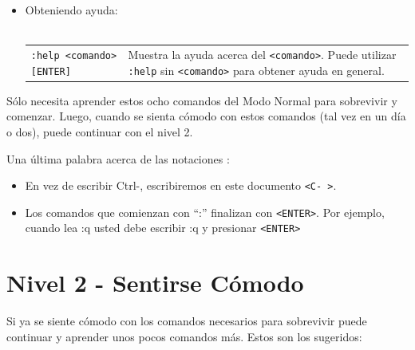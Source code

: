 \documentclass[12pt]{article}
\begin{document}
\begin{itemize}
	\item Obteniendo ayuda: \\ \\
\begin{tabular}{ l l }
	\texttt{:help <comando>[ENTER]}  & Muestra la ayuda acerca del \texttt{<comando>}. Puede utilizar \texttt{:help} sin \texttt{<comando>} para obtener ayuda en general. \\
\end{tabular}
\end{itemize}

Sólo necesita aprender estos ocho comandos del Modo Normal para sobrevivir y comenzar.
Luego, cuando se sienta cómodo con estos comandos (tal vez en un día o dos), puede continuar con el nivel 2.




Una última palabra acerca de las notaciones :

\begin{itemize}
	\item En vez de escribir Ctrl-, escribiremos en este documento \texttt{<C- >}.
	\item Los comandos que comienzan con ``:'' finalizan con \texttt{<ENTER>}. Por ejemplo,
cuando lea :q usted debe escribir :q y presionar \texttt{<ENTER>}
\end{itemize}


\section{Nivel 2 - Sentirse Cómodo}


Si ya se siente cómodo con los comandos necesarios para sobrevivir 
puede continuar y aprender unos pocos comandos más. Estos son los sugeridos:
\end{document}

